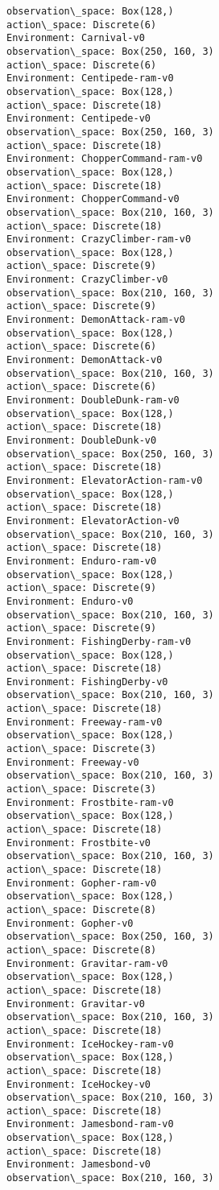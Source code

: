 \documentclass[11pt]{article}
\begin{document}
\begin{Verbatim}[commandchars=\\\{\}]
observation\_space: Box(128,)
action\_space: Discrete(6)
Environment: Carnival-v0
observation\_space: Box(250, 160, 3)
action\_space: Discrete(6)
Environment: Centipede-ram-v0
observation\_space: Box(128,)
action\_space: Discrete(18)
Environment: Centipede-v0
observation\_space: Box(250, 160, 3)
action\_space: Discrete(18)
Environment: ChopperCommand-ram-v0
observation\_space: Box(128,)
action\_space: Discrete(18)
Environment: ChopperCommand-v0
observation\_space: Box(210, 160, 3)
action\_space: Discrete(18)
Environment: CrazyClimber-ram-v0
observation\_space: Box(128,)
action\_space: Discrete(9)
Environment: CrazyClimber-v0
observation\_space: Box(210, 160, 3)
action\_space: Discrete(9)
Environment: DemonAttack-ram-v0
observation\_space: Box(128,)
action\_space: Discrete(6)
Environment: DemonAttack-v0
observation\_space: Box(210, 160, 3)
action\_space: Discrete(6)
Environment: DoubleDunk-ram-v0
observation\_space: Box(128,)
action\_space: Discrete(18)
Environment: DoubleDunk-v0
observation\_space: Box(250, 160, 3)
action\_space: Discrete(18)
Environment: ElevatorAction-ram-v0
observation\_space: Box(128,)
action\_space: Discrete(18)
Environment: ElevatorAction-v0
observation\_space: Box(210, 160, 3)
action\_space: Discrete(18)
Environment: Enduro-ram-v0
observation\_space: Box(128,)
action\_space: Discrete(9)
Environment: Enduro-v0
observation\_space: Box(210, 160, 3)
action\_space: Discrete(9)
Environment: FishingDerby-ram-v0
observation\_space: Box(128,)
action\_space: Discrete(18)
Environment: FishingDerby-v0
observation\_space: Box(210, 160, 3)
action\_space: Discrete(18)
Environment: Freeway-ram-v0
observation\_space: Box(128,)
action\_space: Discrete(3)
Environment: Freeway-v0
observation\_space: Box(210, 160, 3)
action\_space: Discrete(3)
Environment: Frostbite-ram-v0
observation\_space: Box(128,)
action\_space: Discrete(18)
Environment: Frostbite-v0
observation\_space: Box(210, 160, 3)
action\_space: Discrete(18)
Environment: Gopher-ram-v0
observation\_space: Box(128,)
action\_space: Discrete(8)
Environment: Gopher-v0
observation\_space: Box(250, 160, 3)
action\_space: Discrete(8)
Environment: Gravitar-ram-v0
observation\_space: Box(128,)
action\_space: Discrete(18)
Environment: Gravitar-v0
observation\_space: Box(210, 160, 3)
action\_space: Discrete(18)
Environment: IceHockey-ram-v0
observation\_space: Box(128,)
action\_space: Discrete(18)
Environment: IceHockey-v0
observation\_space: Box(210, 160, 3)
action\_space: Discrete(18)
Environment: Jamesbond-ram-v0
observation\_space: Box(128,)
action\_space: Discrete(18)
Environment: Jamesbond-v0
observation\_space: Box(210, 160, 3)

\end{Verbatim}
\end{document}
